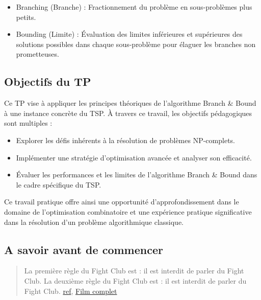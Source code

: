 \begin{itemize}
\item
  Branching (Branche) : Fractionnement du problème en sous-problèmes
  plus petits.
\item
  Bounding (Limite) : Évaluation des limites inférieures et supérieures
  des solutions possibles dans chaque sous-problème pour élaguer les
  branches non prometteuses.
\end{itemize}

\subsection{Objectifs du TP}\label{objectifs-du-tp}

Ce TP vise à appliquer les principes théoriques de l'algorithme Branch
\& Bound à une instance concrète du TSP. À travers ce travail, les
objectifs pédagogiques sont multiples :

\begin{itemize}
\item Explorer les défis inhérents à la résolution de problèmes NP-complets.
\item Implémenter une stratégie d'optimisation avancée et analyser son efficacité.
\item Évaluer les performances et les limites de l'algorithme Branch \& Bound dans le cadre spécifique du TSP.
\end{itemize}

Ce travail pratique offre ainsi une opportunité d'approfondissement dans le domaine de l'optimisation combinatoire et une expérience pratique significative dans la résolution d'un problème algorithmique classique.

\subsection{A savoir avant de
commencer}\label{a-savoir-avant-de-commencer}

\begin{quote}
La première règle du Fight Club est : il est interdit de parler du Fight Club. La deuxième règle du Fight Club est : il est interdit de parler du Fight Club. \href{https://fr.wikiquote.org/wiki/Fight_Club_(film)}{ref}, \href{https://youtu.be/dQw4w9WgXcQ?si=tj0D73HyWAFtNyZT}{Film complet}
\end{quote}

